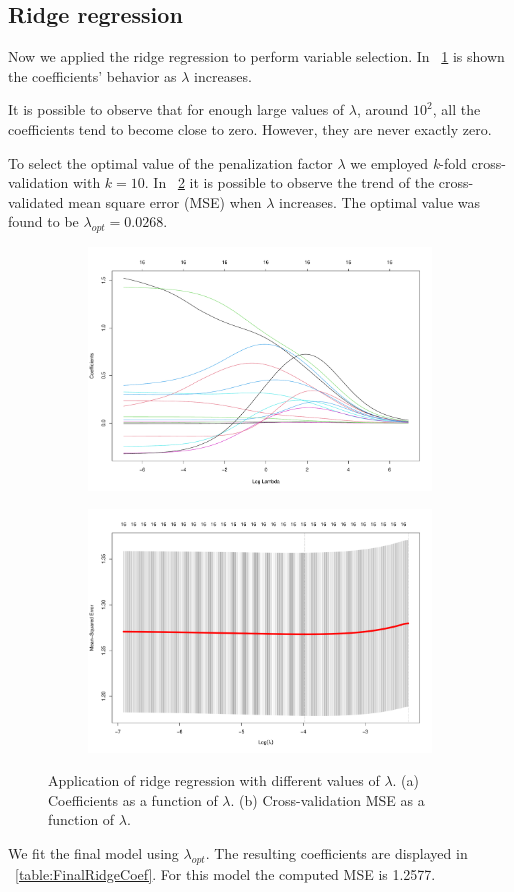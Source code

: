 \subsection{Ridge regression}

Now we applied the ridge regression to perform variable selection. In \Fig~\ref{fig:RidgeCoefVsLambda} is shown the coefficients' behavior as $\lambda$ increases. 

It is possible to observe that for enough large values of $\lambda$, around $10^2$, all the coefficients tend to become close to zero. However, they are never exactly zero.

To select the optimal value of the penalization factor $\lambda$ we employed \textit{k}-fold cross-validation with $\textit{k}=10$. In \Fig~\ref{fig:RidgeCvPlot} it is possible to observe the trend of the cross-validated mean square error (MSE) when $\lambda$ increases. The optimal value was found to be $\lambda_{opt} = 0.0268$.

\begin{figure}[h]
	\centering
	\begin{subfigure}{.5\textwidth}
		\centering
		\includegraphics[width=0.7\linewidth]{ImageFiles/Regression/Ridge/RidgeCoefVsLambda.pdf}
		\caption{}
		\label{fig:RidgeCoefVsLambda}
	\end{subfigure}%
	\begin{subfigure}{.5\textwidth}
		\centering
		\includegraphics[width=0.7\linewidth]{ImageFiles/Regression/Ridge/RidgeCvPlot.pdf}
		\caption{}
		\label{fig:RidgeCvPlot}
	\end{subfigure}
	\caption{Application of ridge regression with different values of $\lambda$. (a) Coefficients as a function of $\lambda$. (b) Cross-validation MSE as a function of $\lambda$.}
	\label{fig:FinalFSSM}
\end{figure}

We fit the final model using $\lambda_{opt}$. The resulting coefficients are displayed in \Tab~\ref{table:FinalRidgeCoef}. For this model the computed MSE is 1.2577.

